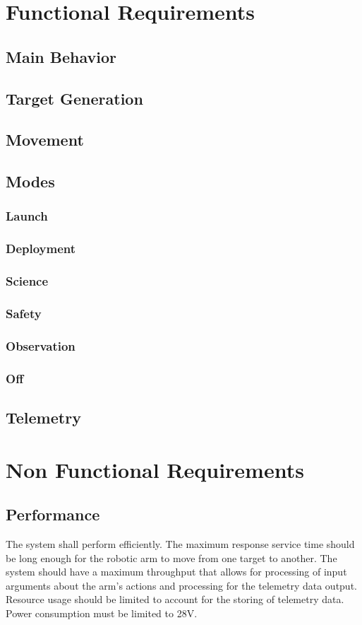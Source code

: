 \documentclass[letterpaper,10pt]{article}
\begin{document}
\section{Functional Requirements}
\subsection{Main Behavior}
\subsection{Target Generation}
\subsection{Movement}
\subsection{Modes}
\subsubsection{Launch}
\subsubsection{Deployment}
\subsubsection{Science}
\subsubsection{Safety}
\subsubsection{Observation}
\subsubsection{Off}
\subsection{Telemetry}

\section{Non Functional Requirements}
\subsection{Performance}
The system shall perform efficiently. The maximum response service time should be long enough for the robotic arm to move from one target to another. The system should have a maximum throughput that allows for processing of input arguments about the arm's actions and processing for the telemetry data output. Resource usage should be limited to account for the storing of telemetry data. Power consumption must be limited to 28V.
\end{document}
